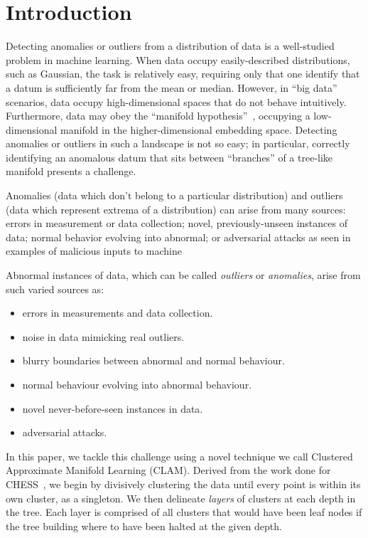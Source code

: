 \section{Introduction}
\label{sec:introduction}

Detecting anomalies or outliers from a distribution of data is a well-studied problem in machine learning. When data occupy easily-described distributions, such as Gaussian, the task is relatively easy, requiring only that one identify that a datum is sufficiently far from the mean or median. However, in ``big data'' scenarios, data occupy high-dimensional spaces that do not behave intuitively. Furthermore, data may obey the ``manifold hypothesis''~\cite{fefferman2016testing}, occupying a low-dimensional manifold in the higher-dimensional embedding space. Detecting anomalies or outliers in such a landscape is not so easy; in particular, correctly identifying an anomalous datum that sits between ``branches'' of a tree-like manifold presents a challenge.

Anomalies (data which don't belong to a particular distribution) and outliers (data which represent extrema of a distribution) can arise from many sources: errors in measurement or data collection; novel, previously-unseen instances of data; normal behavior evolving into abnormal; or adversarial attacks as seen in examples of malicious inputs to machine

Abnormal instances of data, which can be called \textit{outliers} or \textit{anomalies}, arise from such varied sources as:
\begin{itemize}
    \item errors in measurements and data collection.
    \item noise in data mimicking real outliers.
    \item blurry boundaries between abnormal and normal behaviour.
    \item normal behaviour evolving into abnormal behaviour.
    \item novel never-before-seen instances in data.
    \item adversarial attacks.
\end{itemize}

In this paper, we tackle this challenge using a novel technique we call Clustered Approximate Manifold Learning (CLAM).
Derived from the work done for CHESS~\cite{ishaq2019entropy}, we begin by divisively clustering the data until every point is within its own cluster, as a singleton.
We then delineate \textit{layers} of clusters at each depth in the tree.
Each layer is comprised of all clusters that would have been leaf nodes if the tree building where to have been halted at the given depth.

